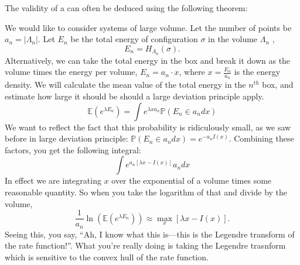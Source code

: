 The validity of a  can often be deduced using the following theorem: 

We would like to consider systems of large volume. Let the number of points be $a_n = |\Lambda_n|$. Let $E_n$ be  %
the total energy of configuration $\sigma$ in the volume $\Lambda_n$ , 
\[E_n = H_{\Lambda_n}(\sigma).\] 
Alternatively, we can take the total energy in the box and break it down as the volume times the energy per volume, 
$E_n = a_n \cdot x$, where $x = \frac{E_n}{a_n}$ is the energy density. We will calculate the mean value of the total energy in the $n^{th}$ box, and estimate how large it should be should a large deviation principle apply. 
\[
\mathbb{E} \left(e^{\lambda E_n}\right) = \int e^{\lambda x a_n} \mathbb{P}(E_n \in a_n dx)
\] 
We want to reflect the fact that this probability is ridiculously small, as we saw before in large deviation principle: $\mathbb{P}(E_n \in a_ndx) = e^{-a_nI(x)}$. Combining these factors, you get the following integral: 
\[
\int e^{a_n\left[ \lambda x - I(x)\right]}a_n dx
\]
In effect we are integrating $x$ over the exponential of a volume times some reasonable quantity. So when you take the logarithm of that and divide by the volume, 
\[\frac{1}{a_n}\ln(\mathbb{E}(e^{\lambda E_n})) \approx \max_x [\lambda x - I(x)].\] Seeing this, you say, ``Ah, I know what this is---this is the Legendre transform of the rate function!''. What you're really doing is taking the Legendre trasnform which is sensitive to the convex hull of the rate function. 

